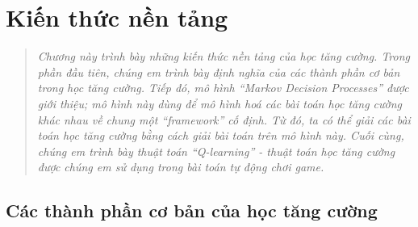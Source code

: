 \chapter{Kiến thức nền tảng}
\ifpdf
\graphicspath{{Chapter2/Chapter2Figs/PNG/}{Chapter2/Chapter2Figs/PDF/}{Chapter2/Chapter2Figs/}}
\else
\graphicspath{{Chapter2/Chapter2Figs/EPS/}{Chapter2/Chapter2Figs/}}
\fi
\begin{quote}
	\textit{Chương này trình bày những kiến thức nền tảng của học tăng cường. 
	Trong phần đầu tiên, chúng em trình bày định nghĩa của các thành phần cơ bản trong học tăng cường. 
	Tiếp đó, mô hình ``Markov Decision Processes'' được giới thiệu; mô hình này dùng để mô hình hoá các bài toán học tăng cường khác nhau về chung một ``framework'' cố định.
	Từ đó, ta có thể giải các bài toán học tăng cường bằng cách giải bài toán trên mô hình này.
	Cuối cùng, chúng em trình bày thuật toán ``Q-learning'' - thuật toán học tăng cường được chúng em sử dụng trong bài toán tự động chơi game.}
\end{quote}

\section{Các thành phần cơ bản của học tăng cường}
